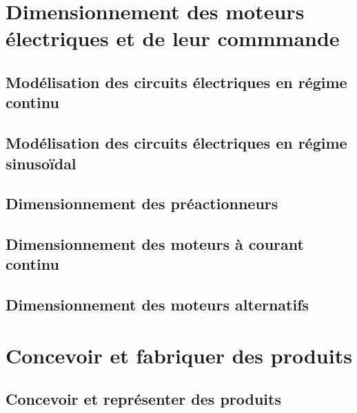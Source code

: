 \setchapterpreamble[u]{\margintoc} 
\chapter{Dimensionnement des moteurs électriques et de leur commmande} 
\section{Modélisation des circuits électriques en régime continu} 
\clearpage 
\newpage 
\section{Modélisation des circuits électriques en régime sinusoïdal} 
\clearpage 
\newpage 
\section{Dimensionnement des préactionneurs} 
\clearpage 
\newpage 
\section{Dimensionnement des moteurs à courant continu} 
\clearpage 
\newpage 
\section{Dimensionnement des moteurs alternatifs} 
\clearpage 
\newpage 
\setchapterpreamble[u]{\margintoc} 
\chapter{Concevoir et fabriquer des produits} 
\section{Concevoir et représenter des produits} 
\graphicspath{{\repStyle/png/}{../PPM/PPM-01/1000_Dessin2D/images/}} 
 
 
\graphicspath{{\repStyle/png/}{../PPM/PPM-01/1001_Dessin2D/images/}} 
 
 
\graphicspath{{\repStyle/png/}{../PPM/PPM-01/1002_Dessin2D/images/}} 
 
 
\graphicspath{{\repStyle/png/}{../PPM/PPM-01/1003_Dessin2D/images/}} 
 
 
\graphicspath{{\repStyle/png/}{../PPM/PPM-01/1004_Dessin2D/images/}} 
 
 
